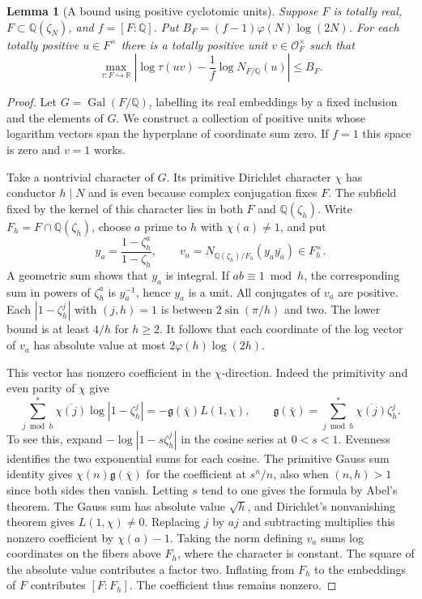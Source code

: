 \documentclass[a4paper,11pt]{article}
\newtheorem{lemma}[proposition]{Lemma}
\theoremstyle{definition}
\theoremstyle{remark}
\newcommand{\RR}{\mathbb R}\newcommand{\CC}{\mathbb C}\newcommand{\QQ}{\mathbb Q}
\numberwithin{equation}{section}
\newcommand{\OO}{\mathcal O}
\begin{document}
\begin{lemma}[A bound using positive cyclotomic units]
\label{lem:unit179}
Suppose \(F\) is totally real, \(F\subset\QQ(\zeta_N)\),
and \(f=[F:\QQ]\). Put \(B_F=(f-1)\varphi(N)\log(2N)\).
For each totally positive \(u\in F^\times\) there is a
totally positive unit \(v\in\OO_F^\times\) such that
\[
   \max_{\tau:F\hookrightarrow\RR}
   \left|\log\tau(uv)-\frac1f\log N_{F/\QQ}(u)\right|\le B_F.
\]
\end{lemma}
\begin{proof}
Let \(G=\operatorname{Gal}(F/\QQ)\), labelling its real
embeddings by a fixed inclusion and the elements of \(G\).
We construct a collection of positive units whose logarithm
vectors span the hyperplane of coordinate sum zero. If
\(f=1\) this space is zero and \(v=1\) works.

Take a nontrivial character of \(G\). Its primitive Dirichlet
character \(\chi\) has conductor \(h\mid N\) and is even
because complex conjugation fixes \(F\). The subfield fixed by the kernel of this character lies in both
\(F\) and \(\QQ(\zeta_h)\). Write
\(F_h=F\cap\QQ(\zeta_h)\), choose \(a\) prime to \(h\)
with \(\chi(a)\ne1\), and put
\[
 y_a=\frac{1-\zeta_h^a}{1-\zeta_h},\qquad
 v_a=N_{\QQ(\zeta_h)/F_h}(y_a\overline{y_a})\in F_h^\times.
\]
A geometric sum shows that \(y_a\) is integral. If \(ab\equiv
1\bmod h\), the corresponding sum in powers of \(\zeta_h^a\)
is \(y_a^{-1}\), hence \(y_a\) is a unit. All conjugates of
\(v_a\) are positive. Each \(|1-\zeta_h^j|\) with
\((j,h)=1\) is between \(2\sin(\pi/h)\) and two. The lower
bound is at least \(4/h\) for \(h\ge2\). It follows that
each coordinate of the log vector of \(v_a\) has absolute
value at most \(2\varphi(h)\log(2h)\).

This vector has nonzero coefficient in the \(\chi\)-direction.
Indeed the primitivity and even parity of \(\chi\) give
\[
 \sum_{j\bmod h}^{*}\overline{\chi(j)}\log|1-\zeta_h^j|
              =-\mathfrak g(\bar\chi)L(1,\chi),
 \qquad \mathfrak g(\bar\chi)=\sum_{j\bmod h}^{*}
                           \overline{\chi(j)}\zeta_h^j.
\]
To see this, expand \(-\log|1-s\zeta_h^j|\) in the
cosine series at \(0<s<1\). Evenness identifies the
two exponential sums for each cosine. The primitive Gauss
sum identity gives \(\chi(n)\mathfrak g(\bar\chi)\) for
the coefficient at \(s^n/n\), also when \((n,h)>1\) since
both sides then vanish. Letting \(s\) tend to one gives
the formula by Abel's theorem. The Gauss sum has absolute
value \(\sqrt h\), and Dirichlet's nonvanishing theorem
gives \(L(1,\chi)\ne0\). Replacing \(j\) by \(aj\) and
subtracting multiplies this nonzero coefficient by
\(\chi(a)-1\). Taking the norm defining \(v_a\) sums log
coordinates on the fibers above \(F_h\), where the character
is constant. The square of the absolute value contributes
a factor two. Inflating from \(F_h\) to the embeddings
of \(F\) contributes \([F:F_h]\). The coefficient thus
remains nonzero.


\end{proof}
\end{document}
